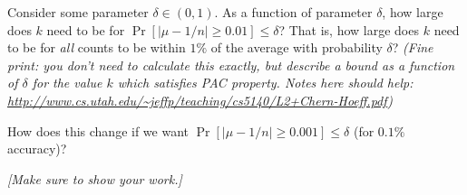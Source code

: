 \documentclass[11pt]{article}
\begin{document}
Consider some parameter $\delta \in (0,1)$.  
As a function of parameter $\delta$, how large does $k$ need to be for 
$\Pr[ |\mu - 1/n| \geq 0.01] \leq \delta$?
That is, how large does $k$ need to be for \emph{all} counts to be within $1\%$ of the average with probability $\delta$? 
\emph{(Fine print:  you don't need to calculate this exactly, but describe a bound as a function of $\delta$ for the value $k$ which satisfies PAC property.  Notes here should help: \url{http://www.cs.utah.edu/~jeffp/teaching/cs5140/L2+Chern-Hoeff.pdf})}

How does this change if we want
$\Pr[ |\mu - 1/n| \geq 0.001] \leq \delta$ (for $0.1\%$ accuracy)?

\emph{[Make sure to show your work.]}
\end{document}
